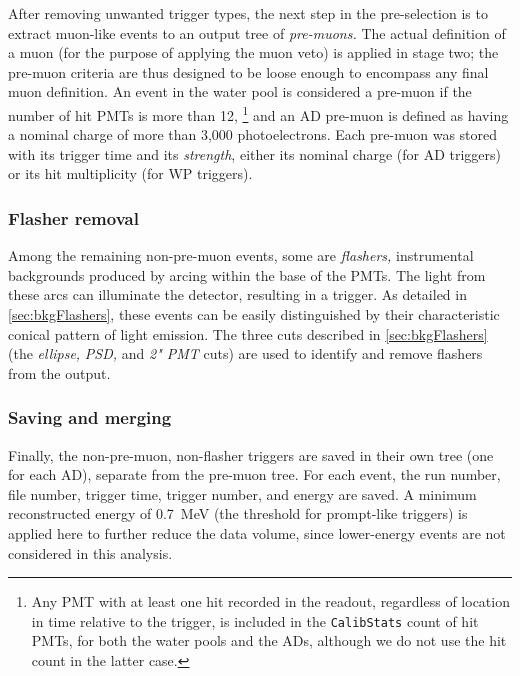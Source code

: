\documentclass[../thesis.tex]{subfiles}
\begin{document}
After removing unwanted trigger types, the next step in the pre-selection is to extract muon-like events to an output tree of \emph{pre-muons.} The actual definition of a muon (for the purpose of applying the muon veto) is applied in stage two; the pre-muon criteria are thus designed to be loose enough to encompass any final muon definition. An event in the water pool is considered a pre-muon if the number of hit PMTs is more than 12,%
\footnote{Any PMT with at least one hit recorded in the readout, regardless of location in time relative to the trigger, is included in the \texttt{CalibStats} count of hit PMTs, for both the water pools and the ADs, although we do not use the hit count in the latter case.}%
and an AD pre-muon is defined as having a nominal charge of more than 3,000 photoelectrons.
Each pre-muon was stored with its trigger time and its \emph{strength}, either its nominal charge (for AD triggers) or its hit multiplicity (for WP triggers).

\subsubsection{Flasher removal}
\label{sec:selFlashers}

Among the remaining non-pre-muon events, some are \emph{flashers,} instrumental backgrounds produced by arcing within the base of the PMTs. The light from these arcs can illuminate the detector, resulting in a trigger. As detailed in \autoref{sec:bkgFlashers}, these events can be easily distinguished by their characteristic conical pattern of light emission. The three cuts described in \autoref{sec:bkgFlashers} (the \emph{ellipse,} \emph{PSD,} and \emph{2" PMT} cuts) are used to identify and remove flashers from the output.

\subsubsection{Saving and merging}
\label{sec:selMergingOne}

Finally, the non-pre-muon, non-flasher triggers are saved in their own tree (one for each AD), separate from the pre-muon tree. For each event, the run number, file number, trigger time, trigger number, and energy are saved. A minimum reconstructed energy of 0.7~MeV (the threshold for prompt-like triggers) is applied here to further reduce the data volume, since lower-energy events are not considered in this analysis.
\end{document}
